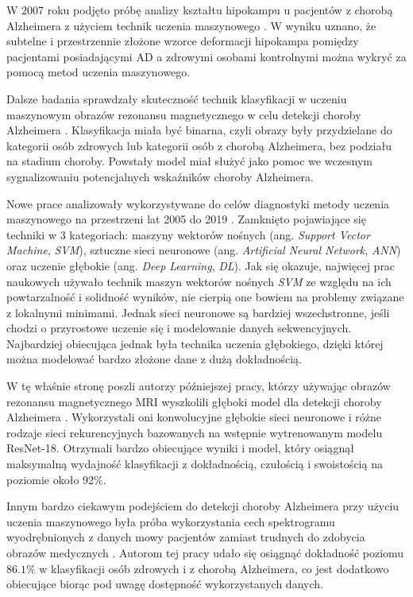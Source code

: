 W 2007 roku podjęto próbę analizy kształtu hipokampu u pacjentów z chorobą Alzheimera z użyciem technik uczenia maszynowego \cite{li2007hippocampal}.
W wyniku uznano, że subtelne i przestrzennie złożone wzorce deformacji hipokampa pomiędzy pacjentami posiadającymi AD a zdrowymi osobami kontrolnymi można wykryć za pomocą metod uczenia maszynowego.

Dalsze badania sprawdzały skuteczność technik klasyfikacji w uczeniu maszynowym obrazów rezonansu magnetycznego w celu detekcji choroby Alzheimera \cite{herrera2013classification}.
Klasyfikacja miała być binarna, czyli obrazy były przydzielane do kategorii osób zdrowych lub kategorii osób z chorobą Alzheimera, bez podziału na stadium choroby.
Powstały model miał służyć jako pomoc we wczesnym sygnalizowaniu potencjalnych wskaźników choroby Alzheimera.

Nowe prace analizowały wykorzystywane do celów diagnostyki metody uczenia maszynowego na przestrzeni lat 2005 do 2019 \cite{tanveer2020machine}.
Zamknięto pojawiające się techniki w 3 kategoriach: maszyny wektorów nośnych (ang. \emph{Support Vector Machine}, \emph{SVM}), sztuczne sieci neuronowe (ang. \emph{Artificial Neural Network}, \emph{ANN}) oraz uczenie głębokie (ang. \emph{Deep Learning}, \emph{DL}).
Jak się okazuje, najwięcej prac naukowych używało technik maszyn wektorów nośnych \emph{SVM} ze względu na ich powtarzalność i solidność wyników, nie cierpią one bowiem na problemy związane z lokalnymi minimami.
Jednak sieci neuronowe są bardziej wszechstronne, jeśli chodzi o przyrostowe uczenie się i modelowanie danych sekwencyjnych.
Najbardziej obiecująca jednak była technika uczenia głębokiego, dzięki której można modelować bardzo złożone dane z dużą dokładnością.

W tę właśnie stronę poszli autorzy późniejszej pracy, którzy używając obrazów rezonansu magnetycznego MRI wyszkolili głęboki model dla detekcji choroby Alzheimera \cite{ebrahimi2021deep}.
Wykorzystali oni konwolucyjne głębokie sieci neuronowe i różne rodzaje sieci rekurencyjnych bazowanych na wstępnie wytrenowanym modelu ResNet-18.
Otrzymali bardzo obiecujące wyniki i model, który osiągnął maksymalną wydajność klasyfikacji z dokładnością, czułością i swoistością na poziomie około 92\%.

Innym bardzo ciekawym podejściem do detekcji choroby Alzheimera przy użyciu uczenia maszynowego była próba wykorzystania cech spektrogramu wyodrębnionych z danych mowy pacjentów zamiast trudnych do zdobycia obrazów medycznych \cite{liu2020new}.
Autorom tej pracy udało się osiągnąć dokładność poziomu $86.1\%$ w klasyfikacji osób zdrowych i z chorobą Alzheimera, co jest dodatkowo obiecujące biorąc pod uwagę dostępność wykorzystanych danych.

